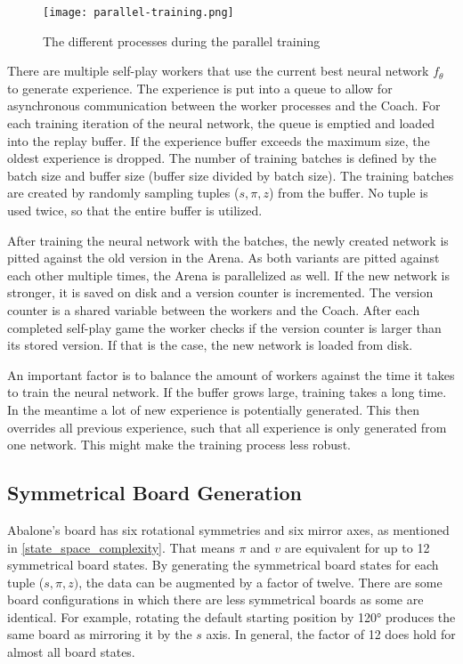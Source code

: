 \begin{figure}[H]
    \centering
    \texttt{[image: parallel-training.png]}
    \caption{The different processes during the parallel training \cite[cf. p. 45]{bruasdal_deep_2020}}
    \label{parallel_training_pipeline}
\end{figure}

There are multiple self-play workers that use the current best neural network $f_{\theta}$ to generate experience. The experience is put into a queue to allow for asynchronous communication between the worker processes and the Coach. For each training iteration of the neural network, the queue is emptied and loaded into the replay buffer. If the experience buffer exceeds the maximum size, the oldest experience is dropped. The number of training batches is defined by the batch size and buffer size (buffer size divided by batch size). The training batches are created by randomly sampling tuples ($s, \pi, z$) from the buffer. No tuple is used twice, so that the entire buffer is utilized.

After training the neural network with the batches, the newly created network is pitted against the old version in the Arena. As both variants are pitted against each other multiple times, the Arena is parallelized as well. If the new network is stronger, it is saved on disk and a version counter is incremented. The version counter is a shared variable between the workers and the Coach. After each completed self-play game the worker checks if the version counter is larger than its stored version. If that is the case, the new network is loaded from disk.

An important factor is to balance the amount of workers against the time it takes to train the neural network. If the buffer grows large, training takes a long time. In the meantime a lot of new experience is potentially generated. This then overrides all previous experience, such that all experience is only generated from one network. This might make the training process less robust.

\subsection{Symmetrical Board Generation}
Abalone's board has six rotational symmetries and six mirror axes, as mentioned in \ref{state_space_complexity}. That means $\pi$ and $v$ are equivalent for up to 12 symmetrical board states. By generating the symmetrical board states for each tuple ($s, \pi, z)$, the data can be augmented by a factor of twelve. There are some board configurations in which there are less symmetrical boards as some are identical. For example, rotating the default starting position by 120° produces the same board as mirroring it by the $s$ axis. In general, the factor of 12 does hold for almost all board states.

